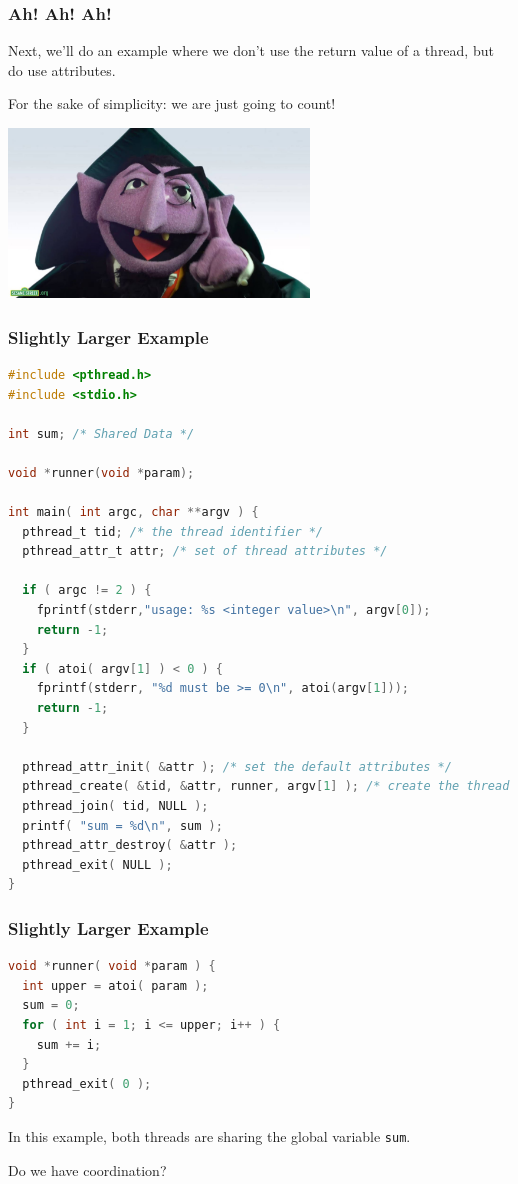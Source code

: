 \begin{frame}
	\frametitle{Ah! Ah! Ah!}

	Next, we'll do an example where we don't use the return value of a thread, but do use attributes.

	For the sake of simplicity: we are just going to count!

	\begin{center}
		\includegraphics[width=0.6\textwidth]{images/countvoncount.jpg}
	\end{center}


\end{frame}



\begin{frame}[fragile]
	\frametitle{Slightly Larger Example}

	\begin{lstlisting}[language=C]
#include <pthread.h>
#include <stdio.h>

int sum; /* Shared Data */

void *runner(void *param);

int main( int argc, char **argv ) {
  pthread_t tid; /* the thread identifier */
  pthread_attr_t attr; /* set of thread attributes */

  if ( argc != 2 ) {
    fprintf(stderr,"usage: %s <integer value>\n", argv[0]);
    return -1;
  }
  if ( atoi( argv[1] ) < 0 ) {
    fprintf(stderr, "%d must be >= 0\n", atoi(argv[1]));
    return -1;
  }

  pthread_attr_init( &attr ); /* set the default attributes */
  pthread_create( &tid, &attr, runner, argv[1] ); /* create the thread */
  pthread_join( tid, NULL );
  printf( "sum = %d\n", sum );
  pthread_attr_destroy( &attr );
  pthread_exit( NULL );
}
\end{lstlisting}


\end{frame}

\begin{frame}[fragile]
	\frametitle{Slightly Larger Example}


	\begin{lstlisting}[language=C]
void *runner( void *param ) {
  int upper = atoi( param );
  sum = 0;
  for ( int i = 1; i <= upper; i++ ) {
    sum += i;
  }
  pthread_exit( 0 );
}
\end{lstlisting}

	In this example, both threads are sharing the global variable \texttt{sum}.

	Do we have coordination?

\end{frame}


